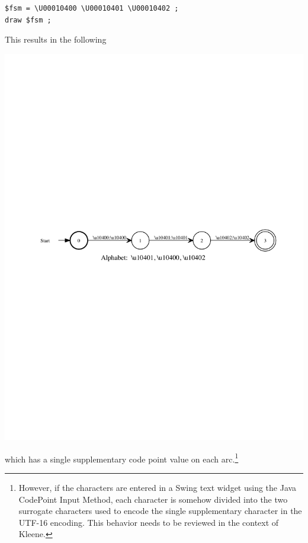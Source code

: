 \begin{Verbatim}
$fsm = \U00010400 \U00010401 \U00010402 ;
draw $fsm ;
\end{Verbatim}

\noindent
This results in the following \fsm


\begin{center}
\includegraphics[width=135mm]{images/desalph.pdf}
\end{center}

\noindent
which has a single supplementary code point value on each arc.\footnote{However, if the
characters are entered in a Swing text widget using the Java CodePoint Input Method, each
character is somehow divided into the two  surrogate characters used to encode
the single supplementary character in the UTF-16 encoding.  This behavior needs to be
reviewed in the context of Kleene.}




